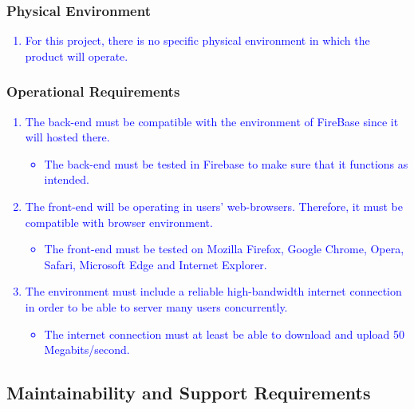 \documentclass[12pt]{article}
\begin{document}
\subsubsection{Physical Environment}
\textcolor{blue}{
\begin{enumerate}
    \item For this project, there is no specific physical environment in which the product will operate.
\end{enumerate}
}
\subsubsection{Operational Requirements}
\textcolor{blue}{
\begin{enumerate}
    \item The back-end must be compatible with the environment of FireBase since it will hosted there.
    \begin{itemize}
        \item The back-end must be tested in Firebase to make sure that it functions as intended.
    \end{itemize}
    \item The front-end will be operating in users' web-browsers. Therefore, it must be compatible with browser environment.
    \begin{itemize}
        \item The front-end must be tested on Mozilla Firefox, Google Chrome, Opera, Safari, Microsoft Edge and Internet Explorer.
    \end{itemize}
    \item The environment must include a reliable high-bandwidth internet connection in order to be able to server many users concurrently.
    \begin{itemize}
        \item The internet connection must at least be able to download and upload 50 Megabits/second.
    \end{itemize}
\end{enumerate}
}
\subsection{Maintainability and Support Requirements}
\end{document}
